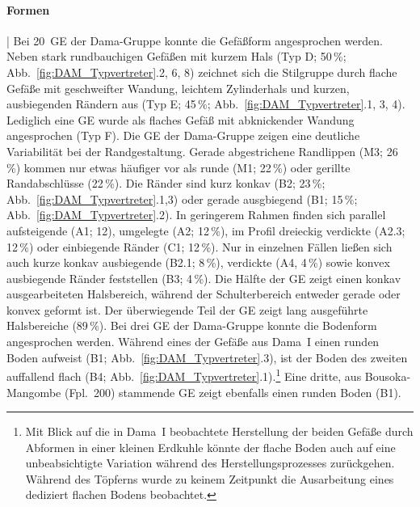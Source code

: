 \paragraph{Formen}\hspace{-.5em}|\hspace{.5em}%
Bei 20~GE der Dama-Gruppe konnte die Gefäßform angesprochen werden. Neben stark rundbauchigen Gefäßen mit kurzem Hals (Typ D; 50\,\%; Abb.~\ref{fig:DAM_Typvertreter}.2, 6, 8) zeichnet sich die Stilgruppe durch flache Gefäße mit geschweifter Wandung, leichtem Zylinderhals und kurzen, ausbiegenden Rändern aus (Typ E; 45\,\%; Abb.~\ref{fig:DAM_Typvertreter}.1, 3, 4). Lediglich eine GE wurde als flaches Gefäß mit abknickender Wandung angesprochen (Typ F). Die GE der Dama-Gruppe zeigen eine deutliche Variabilität bei der Randgestaltung. Gerade abgestrichene Randlippen (M3; 26\,\%) kommen nur etwas häufiger vor als runde (M1; 22\,\%) oder gerillte Randabschlüsse (22\,\%). Die Ränder sind kurz konkav (B2; 23\,\%; Abb.~\ref{fig:DAM_Typvertreter}.1,3) oder gerade ausgbiegend (B1; 15\,\%; Abb.~\ref{fig:DAM_Typvertreter}.2). In geringerem Rahmen finden sich parallel aufsteigende (A1; 12), umgelegte (A2; 12\,\%), im Profil dreieckig verdickte (A2.3; 12\,\%) oder einbiegende Ränder (C1; 12\,\%). Nur in einzelnen Fällen ließen sich auch kurze konkav ausbiegende (B2.1; 8\,\%), verdickte (A4, 4\,\%) sowie konvex ausbiegende Ränder feststellen (B3; 4\,\%). Die Hälfte der GE zeigt einen konkav ausgearbeiteten Halsbereich, während der Schulterbereich entweder gerade oder konvex geformt ist. Der überwiegende Teil der GE zeigt lang ausgeführte Halsbereiche (89\,\%). Bei drei GE der Dama-Gruppe konnte die Bodenform angesprochen werden. Während eines der Gefäße aus Dama~I einen runden Boden aufweist (B1; Abb.~\ref{fig:DAM_Typvertreter}.3), ist der Boden des zweiten auffallend flach (B4; Abb.~\ref{fig:DAM_Typvertreter}.1).\footnote{Mit Blick auf die in Dama~I beobachtete Herstellung der beiden Gefäße durch Abformen in einer kleinen Erdkuhle könnte der flache Boden auch auf eine unbeabsichtigte Variation während des Herstellungsprozesses zurückgehen. Während des Töpferns wurde zu keinem Zeitpunkt die Ausarbeitung eines dediziert flachen Bodens beobachtet.} Eine dritte, aus Bousoka-Mangombe (Fpl.~200) stammende GE zeigt ebenfalls einen runden Boden (B1).


